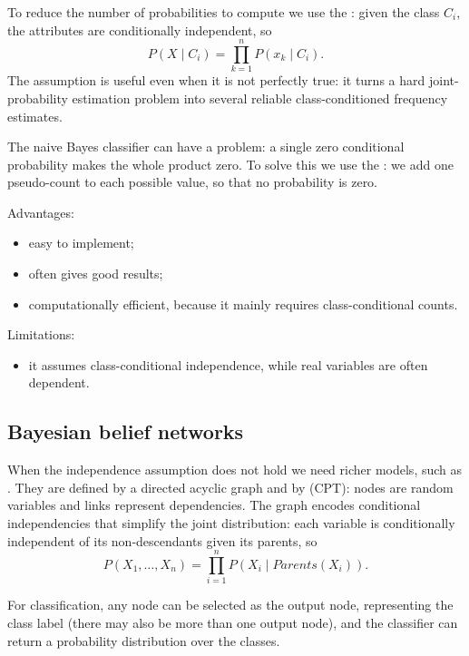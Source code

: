 To reduce the number of probabilities to compute we use the : given the class $C_i$, the attributes are conditionally independent, so
\[
  P(X \mid C_i) = \prod_{k=1}^{n} P(x_k \mid C_i).
\]
The assumption is useful even when it is not perfectly true: it turns a hard joint-probability estimation problem into several reliable class-conditioned frequency estimates.

The naive Bayes classifier can have a problem: a single zero conditional probability makes the whole product zero. To solve this we use the : we add one pseudo-count to each possible value, so that no probability is zero.

Advantages:
\begin{itemize}
  \item easy to implement;
  \item often gives good results;
  \item computationally efficient, because it mainly requires class-conditional counts.
\end{itemize}
Limitations:
\begin{itemize}
  \item it assumes class-conditional independence, while real variables are often dependent.
\end{itemize}

\subsection{Bayesian belief networks}

When the independence assumption does not hold we need richer models, such as . They are defined by a directed acyclic graph and by  (CPT): nodes are random variables and links represent dependencies. The graph encodes conditional independencies that simplify the joint distribution: each variable is conditionally independent of its non-descendants given its parents, so
\[
  P(X_1,\dots,X_n) = \prod_{i=1}^{n} P(X_i \mid \mathit{Parents}(X_i)).
\]

For classification, any node can be selected as the output node, representing the class label (there may also be more than one output node), and the classifier can return a probability distribution over the classes.
